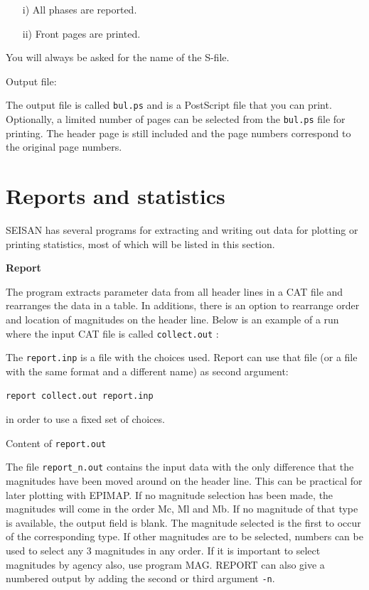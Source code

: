 \begin{itemize}
\item[i)]
All phases are reported. 
\item[ii)]
Front pages are printed. 
\end{itemize}

You will always be asked for the name of the S-file. 

Output file: 

The output file is called \texttt{bul.ps} and is a PostScript 
file that you can print. Optionally, a limited number of pages can 
be selected from the \texttt{bul.ps} file for printing. The header page is 
still included and the page numbers correspond to the original page numbers. 

\section{Reports and statistics}

SEISAN has several programs for extracting and writing out data for plotting or printing statistics, most of which will be listed in this section. 

\textbf{Report}

The program extracts parameter data from all header lines in a CAT 
file and rearranges the data in a table. In additions, there is an 
option to rearrange order and location of magnitudes on the header 
line. Below is an example of a run where the input CAT file is called 
\texttt{collect.out} :



The \texttt{report.inp} is a file with the choices used. Report can use that 
file (or a file with the same format and a different name) as second argument: 

\texttt{report collect.out report.inp}  

in order to use a fixed set of choices. 

Content of \texttt{report.out}



The file \texttt{report\_n.out} contains the input data with the only difference 
that the magnitudes have been moved around on the header line. This 
can be practical for later plotting with EPIMAP. If no magnitude 
selection has been made, the magnitudes will come in the order Mc, 
Ml and Mb. If no magnitude of that type is available, the output 
field is blank. The magnitude selected 
is the first to occur of the corresponding type. If other magnitudes 
are to be selected, numbers can be used to select any 3 magnitudes 
in any order. If it is important to select magnitudes by agency 
also, use program MAG.
REPORT can also give a numbered output by adding the second or third argument \verb|-n|.

